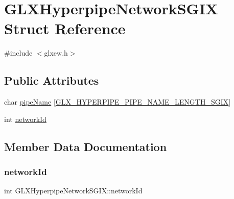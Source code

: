 \hypertarget{struct_g_l_x_hyperpipe_network_s_g_i_x}{}\section{G\+L\+X\+Hyperpipe\+Network\+S\+G\+IX Struct Reference}
\label{struct_g_l_x_hyperpipe_network_s_g_i_x}


{\ttfamily \#include $<$glxew.\+h$>$}

\subsection*{Public Attributes}
\begin{DoxyCompactItemize}
\item 
char \mbox{\hyperlink{struct_g_l_x_hyperpipe_network_s_g_i_x_a6338b9717fa895aec16b932f2ef693ed}{pipe\+Name}} \mbox{[}\mbox{\hyperlink{glxew_8h_ae1c8261c0861010d8003a31d07e26005}{G\+L\+X\+\_\+\+H\+Y\+P\+E\+R\+P\+I\+P\+E\+\_\+\+P\+I\+P\+E\+\_\+\+N\+A\+M\+E\+\_\+\+L\+E\+N\+G\+T\+H\+\_\+\+S\+G\+IX}}\mbox{]}
\item 
int \mbox{\hyperlink{struct_g_l_x_hyperpipe_network_s_g_i_x_a81393053988b32fadb0b21615024add1}{network\+Id}}
\end{DoxyCompactItemize}


\subsection{Member Data Documentation}
\mbox{\label{struct_g_l_x_hyperpipe_network_s_g_i_x_a81393053988b32fadb0b21615024add1}} 
\subsubsection{\texorpdfstring{network\+Id}{networkId}}
{\footnotesize\ttfamily int G\+L\+X\+Hyperpipe\+Network\+S\+G\+I\+X\+::network\+Id}

\mbox{\label{struct_g_l_x_hyperpipe_network_s_g_i_x_a6338b9717fa895aec16b932f2ef693ed}} 
